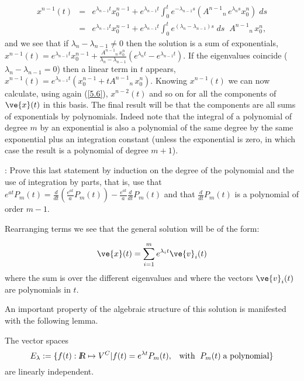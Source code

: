 \begin{eqnarray}
  x^{n-1}(t) &=& e^{\lambda_{n-1}t} x^{n-1}_0  
               + e^{\lambda_{n-1}t} 
               \int_0^t e^{-\lambda_{n-1}s}(A^{n-1}{}_n \,e^{\lambda_n s} x^n_0 )\; ds \\
               &=& e^{\lambda_{n-1}t} x^{n-1}_0  
               + e^{\lambda_{n-1}t} 
               \int_0^t e^{(\lambda_n -\lambda_{n-1})s}\; ds \;\;A^{n-1}{}_n \, x^n_0,
\end{eqnarray}
and we see that if $\lambda_n -\lambda_{n-1} \neq 0$ then the solution
is a sum of exponentials, 
$x^{n-1}(t) = e^{\lambda_{n-1}t} x^{n-1}_0 + \frac{A^{n-1}{}_n \, x^n_0}{\lambda_n -\lambda_{n-1}}(e^{\lambda_{n}t}-e^{\lambda_{n-1}t})$.
If the eigenvalues coincide ($\lambda_n -\lambda_{n-1} = 0$)
then a linear term in $t$ appears, 
$x^{n-1}(t) = e^{\lambda_{n-1}t}(x^{n-1}_0 + t A^{n-1}{}_n \, x^n_0)$.
Knowing $x^{n-1}(t)$ we can now calculate, using again (\ref{5.6}),
$x^{n-2}(t)$ and so on for all the components of $\ve{x}(t)$ in
this basis. 
The final result will be that the components are all sums
of exponentials by polynomials. Indeed note that the integral of
a polynomial of degree $m$ by an exponential is also 
a polynomial of the same degree by the same exponential plus an integration constant
(unless the exponential is zero, in which
case the result is a polynomial of degree $m+1$).
\espa

\ejer: Prove this last statement by induction on the degree
of the polynomial and the use of integration by parts, that is, use
that 
$e^{at}P_m(t) = \frac{d}{dt}(\frac{e^{at}}{a}P_m(t)) - \frac{e^{at}}{a}\frac{d}{dt}{P_m(t)}$
and that  $\frac{d}{dt}{P_m(t)}$ is a polynomial of order $m-1$.

\espa

\noi Rearranging terms we see that the general solution will be 
of the form:

\begin{equation}
  \label{eq:5_sol_gen}
  \ve{x}(t) = \sum_{i=1}^{m} e^{\lambda_i t} \ve{v}_i(t)
\end{equation}
%
where the sum is over the different eigenvalues and where the 
vectors $\ve{v}_i(t)$ are polynomials in $t$.

An important property of the algebraic structure of this solution
is manifested with the following lemma.

\blem
The vector spaces 
\[
E_{\lambda} := \{f(t): \mbox{\sl {l$\!\!\!\;\:\!$R}} \mapsto V^{C} | f(t) = e^{\lambda t}P_m(t), 
\;\;\;\mbox{with }\; P_m(t)\;\mbox{a polynomial}\}
\] 
are linearly independent.
\elem

